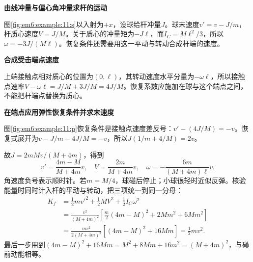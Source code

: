 \begin{solution}\textbf{由线冲量与偏心角冲量求杆的运动}\par\nobreak
图\ref{fig:em6:example:11:s}以入射为$+x$，设球给杆冲量$J$。球末速度$v'=v-J/m$，杆质心速度$V=J/M$。关于质心的冲量矩为$-J\ell$，而$I_C=M\ell^2/3$，所以$\omega=-3J/(M\ell)$。恢复条件还需要用这一平动与转动合成杆端的速度。



\par\medskip{}\noindent\textbf{合成受击端点速度}\par\nobreak
上端接触点相对质心的位置为$(0,\ell)$，其转动速度水平分量为$-\omega\ell$，所以接触点速率$V-\omega\ell=J/M+3J/M=4J/M$。恢复系数应施加在球与这个端点之间，不能把杆端点替换为质心。



\par\medskip{}\noindent\textbf{在端点应用弹性恢复条件并求末速度}\par\nobreak
图\ref{fig:em6:example:11:p}恢复条件是接触点速度差反号：$v'-(4J/M)=-v$。恢复式展开为$v-J/m-4J/M=-v$，所以$J(1/m+4/M)=2v$。

故$J=2mMv/(M+4m)$，得到
\[\boxed{v'=\frac{4m-M}{M+4m}v,\quad V=\frac{2m}{M+4m}v,\quad\omega=-\frac{6m}{(M+4m)\ell}v}.\]
角速度负号表示顺时针。若$m=M/4$，球碰后停止；小球很轻时近似反弹。核验能量时同时计入杆的平动与转动，把三项统一到同一分母：
\begin{align*}
K_f&=\frac12mv'^2+\frac12MV^2+\frac12I_C\omega^2\\
&=\frac{v^2}{(M+4m)^2}
\left[\frac m2(4m-M)^2+2Mm^2+6Mm^2\right]\\
&=\frac{mv^2}{2(M+4m)^2}
\left[(4m-M)^2+16Mm\right]
=\frac12mv^2.
\end{align*}
最后一步用到$(4m-M)^2+16Mm=M^2+8Mm+16m^2=(M+4m)^2$，与碰前动能相等。\end{solution}
